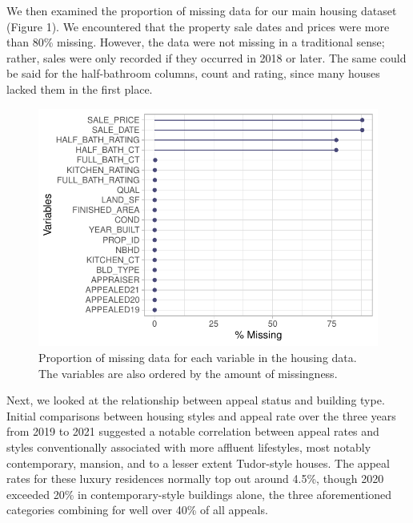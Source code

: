 \documentclass[
  12pt,
]{article}
\begin{document}
We then examined the proportion of missing data for our main housing
dataset (Figure 1). We encountered that the property sale dates
and prices were more than 80\% missing. However, the data were not
missing in a traditional sense; rather, sales were only recorded if they
occurred in 2018 or later. The same could be said for the half-bathroom
columns, count and rating, since many houses lacked them in the first
place.

\begin{figure}[H]

{\centering \includegraphics{unnamed-chunk-3-1} 

}

\caption{Proportion of missing data for each variable in the housing data. The variables are also ordered by the amount of missingness.}\label{fig:unnamed-chunk-3}
\end{figure}

Next, we looked at the relationship between appeal status and building
type. Initial comparisons between housing styles and appeal rate over
the three years from 2019 to 2021 suggested a notable correlation
between appeal rates and styles conventionally associated with more
affluent lifestyles, most notably contemporary, mansion, and to a lesser
extent Tudor-style houses. The appeal rates for these luxury residences
normally top out around 4.5\%, though 2020 exceeded 20\% in
contemporary-style buildings alone, the three aforementioned categories
combining for well over 40\% of all appeals.
\end{document}
